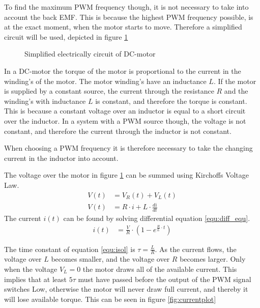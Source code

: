 \documentclass[../../../Main]{subfiles}
\begin{document}
To find the maximum PWM frequency though, it is not necessary to take into account the back EMF. This is because the highest PWM frequency possible, is at the exact moment, when the motor starts to move. Therefore a simplified circuit will be used, depicted in figure \ref{fig:electrical}

\begin{figure}[H]
	\center
    \def\svgwidth{0.4\textwidth}
	
	\caption{Simplified electrically circuit of DC-motor}
  \label{fig:electrical}
\end{figure}


In a DC-motor the torque of the motor is proportional to the current in the winding's of the motor. The motor winding's have an inductance $L$.
If the motor is supplied by a constant source, the current through the resistance $R$ and the winding's with inductance $L$ is constant, and therefore the torque is constant. This is because a constant voltage over an inductor is equal to a short circuit over the inductor.
In a system with a PWM source though, the voltage is not constant, and therefore the current through the inductor is not constant.

When choosing a PWM frequency it is therefore necessary to take the changing current in the inductor into account.

The voltage over the motor in figure \ref{fig:electrical} can be summed using Kirchoffs Voltage Law.
\begin{align}
	V(t) &= V_R(t) + V_L(t)\\
	V(t) &= R \cdot i + L \cdot \frac{di}{dt}
	\label{equ:diff_equ}
\end{align}
The current $i(t)$ can be found by solving differential equation \eqref{equ:diff_equ}.
\begin{align}
	i(t) &=\frac{V}{R} \cdot (1-e^{\frac{R}{L} \cdot t})
	\label{equ:isol}
\end{align}

The time constant of equation \eqref{equ:isol} is $\tau = \frac{L}{R}$.
As the current flows, the voltage over $L$ becomes smaller, and the voltage over $R$ becomes larger. Only when the voltage $V_L = 0$ the motor draws all of the available current.
This implies that at least $5\tau$ must have passed before the output of the PWM signal switches Low, otherwise the motor will never draw full current, and thereby it will lose available torque. This can be seen in figure \ref{fig:currentplot}
\end{document}
